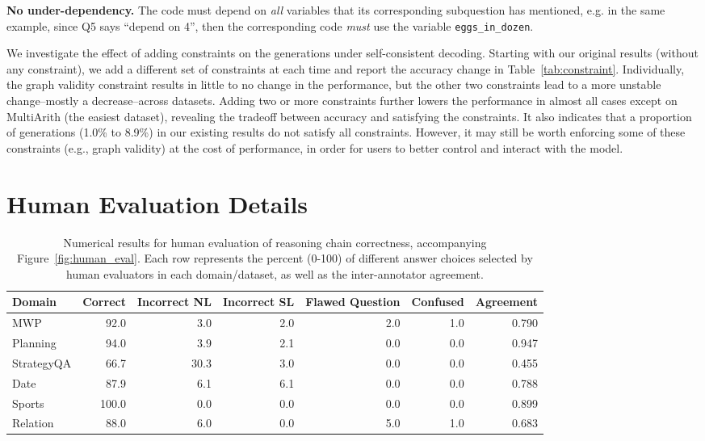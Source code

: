 \documentclass[11pt]{article}
\begin{document}
\textbf{No under-dependency.} The code must depend on \textit{all} variables that its corresponding subquestion has mentioned, e.g. in the same example, since Q5 says ``depend on 4'', then the corresponding code \textit{must} use the variable \texttt{eggs\_in\_dozen}.



We investigate the effect of adding constraints on the generations under self-consistent decoding. Starting with our original results (without any constraint), we add a different set of constraints at each time and report the accuracy change in Table~\ref{tab:constraint}. Individually, the graph validity constraint results in little to no change in the performance, but the other two constraints lead to a more unstable change--mostly a decrease--across datasets. Adding two or more constraints further lowers the performance in almost all cases except on MultiArith (the easiest dataset), revealing the tradeoff between accuracy and satisfying the constraints. It also indicates that a proportion of generations (1.0\% to 8.9\%) in our existing results do not satisfy all constraints. However, it may still be worth enforcing some of these constraints (e.g., graph validity) at the cost of performance, in order for users to better control and interact with the model.  

\section{Human Evaluation Details}
\label{sec:appendix_human_eval_details}

\begin{table}[h]
    \centering
    \vskip 0.15in
    \small
    \begin{tabular}{lrrrrr|r}
         \toprule
         Domain &  Correct & Incorrect NL & Incorrect SL & Flawed Question & Confused & Agreement\\
         \midrule
         MWP & 92.0 & 3.0 & 2.0 & 2.0 & 1.0 & 0.790\\
         Planning & 94.0 & 3.9 & 2.1 & 0.0 & 0.0 & 0.947\\         
         StrategyQA & 66.7 & 30.3 & 3.0 & 0.0 & 0.0 & 0.455\\         
         Date & 87.9 & 6.1 & 6.1 & 0.0 & 0.0 & 0.788\\
         Sports & 100.0 & 0.0 & 0.0 & 0.0 & 0.0 & 0.899\\         
         Relation & 88.0 & 6.0 & 0.0 & 5.0 & 1.0 & 0.683\\
         \bottomrule
    \end{tabular}
\caption{Numerical results for human evaluation of reasoning chain correctness, accompanying Figure~\ref{fig:human_eval}. Each row represents the percent (0-100) of different answer choices selected by human evaluators in each domain/dataset, as well as the inter-annotator agreement.}
    \label{tab:human_eval}
\end{table}
\end{document}
